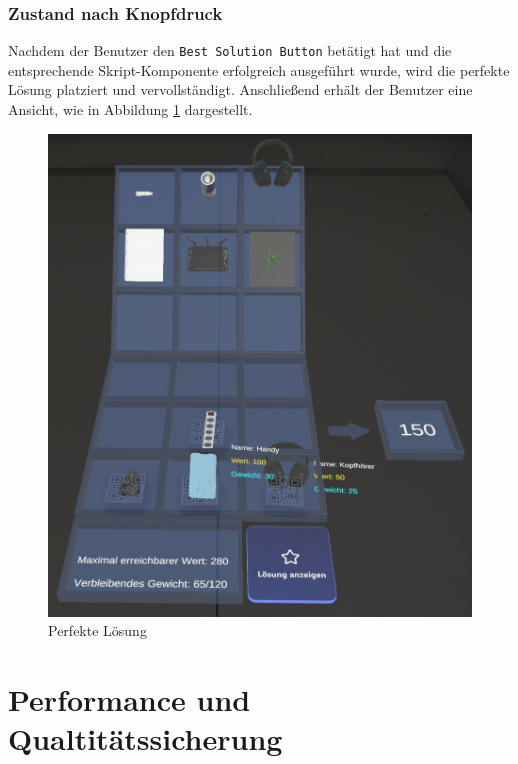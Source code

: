 \subsubsection{Zustand nach Knopfdruck}
Nachdem der Benutzer den \texttt{Best Solution Button} betätigt hat und die entsprechende Skript-Komponente erfolgreich
ausgeführt wurde, wird die perfekte Lösung platziert und vervollständigt. Anschließend erhält der Benutzer eine Ansicht,
wie in Abbildung \ref{fig:perfSolUserPOV} dargestellt.
\begin{figure}[H]
    \centering
    \includegraphics[scale=0.8]{images/perfSolUserPOV}
    \caption{Perfekte Lösung}
    \label{fig:perfSolUserPOV}
\end{figure}

\section{Performance und Qualtitätssicherung} 
